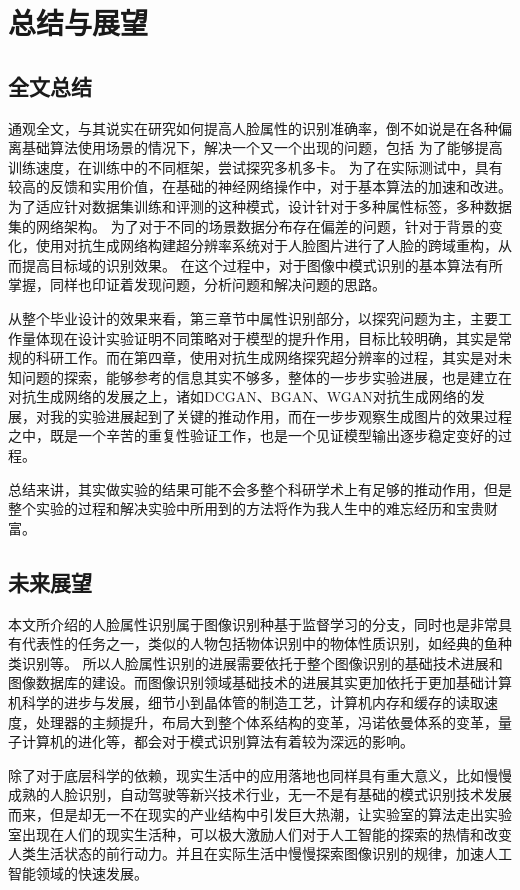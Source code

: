 \chapter{总结与展望}
\section{全文总结}
通观全文，与其说实在研究如何提高人脸属性的识别准确率，倒不如说是在各种偏离基础算法使用场景的情况下，解决一个又一个出现的问题，包括
为了能够提高训练速度，在训练中的不同框架，尝试探究多机多卡。
为了在实际测试中，具有较高的反馈和实用价值，在基础的神经网络操作中，对于基本算法的加速和改进。
为了适应针对数据集训练和评测的这种模式，设计针对于多种属性标签，多种数据集的网络架构。
为了对于不同的场景数据分布存在偏差的问题，针对于背景的变化，使用对抗生成网络构建超分辨率系统对于人脸图片进行了人脸的跨域重构，从而提高目标域的识别效果。
在这个过程中，对于图像中模式识别的基本算法有所掌握，同样也印证着发现问题，分析问题和解决问题的思路。

从整个毕业设计的效果来看，第三章节中属性识别部分，以探究问题为主，主要工作量体现在设计实验证明不同策略对于模型的提升作用，目标比较明确，其实是常规的科研工作。而在第四章，使用对抗生成网络探究超分辨率的过程，其实是对未知问题的探索，能够参考的信息其实不够多，整体的一步步实验进展，也是建立在对抗生成网络的发展之上，诸如DCGAN、BGAN、WGAN对抗生成网络的发展，对我的实验进展起到了关键的推动作用，而在一步步观察生成图片的效果过程之中，既是一个辛苦的重复性验证工作，也是一个见证模型输出逐步稳定变好的过程。

总结来讲，其实做实验的结果可能不会多整个科研学术上有足够的推动作用，但是整个实验的过程和解决实验中所用到的方法将作为我人生中的难忘经历和宝贵财富。
\section{未来展望}
本文所介绍的人脸属性识别属于图像识别种基于监督学习的分支，同时也是非常具有代表性的任务之一，类似的人物包括物体识别中的物体性质识别，如经典的鱼种类识别等。
所以人脸属性识别的进展需要依托于整个图像识别的基础技术进展和图像数据库的建设。而图像识别领域基础技术的进展其实更加依托于更加基础计算机科学的进步与发展，细节小到晶体管的制造工艺，计算机内存和缓存的读取速度，处理器的主频提升，布局大到整个体系结构的变革，冯诺依曼体系的变革，量子计算机的进化等，都会对于模式识别算法有着较为深远的影响。

除了对于底层科学的依赖，现实生活中的应用落地也同样具有重大意义，比如慢慢成熟的人脸识别，自动驾驶等新兴技术行业，无一不是有基础的模式识别技术发展而来，但是却无一不在现实的产业结构中引发巨大热潮，让实验室的算法走出实验室出现在人们的现实生活种，可以极大激励人们对于人工智能的探索的热情和改变人类生活状态的前行动力。并且在实际生活中慢慢探索图像识别的规律，加速人工智能领域的快速发展。



 
